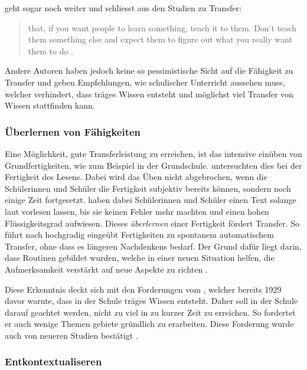 \citeauthor{Detterman1993} geht sogar noch weiter und schliesst aus den Studien zu Transfer:
\begin{quote}
that, if you want people to learn something, teach it to them. Don't teach them something else and expect them to figure out what you really want them to do \citep[S. 21]{Detterman1993}.
\end{quote}

Andere Autoren haben jedoch keine so pessimistische Sicht auf die Fähigkeit zu Transfer und geben Empfehlungen, wie schulischer Unterricht aussehen muss, welcher verhindert, dass träges Wissen entsteht und möglichst viel Transfer von Wissen stattfinden kann.

\subsubsection{Überlernen von Fähigkeiten}
Eine Möglichkeit, gute Transferleistung zu erreichen, ist das intensive einüben von Grundfertigkeiten, wie zum Beispiel in der Grundschule. \citet{LaBerge1974} untersuchten dies bei der Fertigkeit des Lesens. Dabei wird das Üben nicht abgebrochen, wenn die Schülerinnen und Schüler die Fertigkeit subjektiv bereits können, sondern noch einige Zeit fortgesetzt. \citeauthor{LaBerge1974} haben dabei Schülerinnen und Schüler einen Text solange laut vorlesen lassen, bis sie keinen Fehler mehr machten und einen hohen Flüssigkeitsgrad aufwiesen. Dieses \textit{überlernen} einer Fertigkeit fördert Transfer. So führt nach \citet{Perkins1989} hochgradig eingeübt Fertigkeiten zu spontanem automatischem Transfer, ohne dass es längeren Nachdenkens bedarf. Der Grund dafür liegt darin, dass Routinen gebildet wurden, welche in einer neuen Situation helfen, die Aufmerksamkeit verstärkt auf neue Aspekte zu richten \citep{LaBerge1974, Mietzel2007}.

Diese Erkenntnis deckt sich mit den Forderungen vom \citet{Whitehead1929}, welcher bereits 1929 davor warnte, dass in der Schule träges Wissen entsteht. Daher soll in der Schule darauf geachtet werden, nicht zu viel in zu kurzer Zeit zu erreichen. So fordertet er auch wenige Themen gebiete gründlich zu erarbeiten. Diese Forderung wurde auch von neueren Studien bestätigt \citep{Porter1989,Brophy1992a,Millar1999}. 

\subsubsection{Entkontextualiseren}

